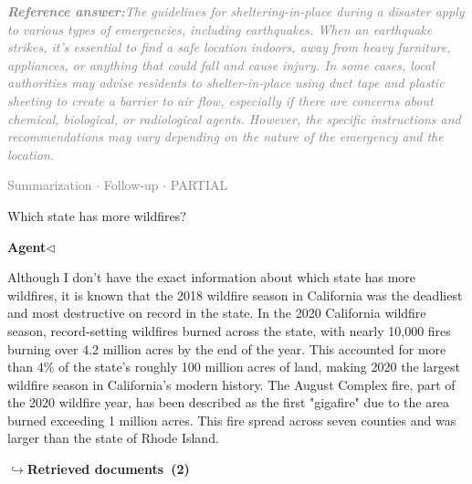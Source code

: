 \documentclass[a4paper,11pt]{article}
\begin{document}
\begin{refanswerenv}
{\footnotesize\textit{\textcolor{gray}{\textbf{Reference answer:}\enspace The guidelines for sheltering-in-place during a disaster apply to various types of emergencies, including earthquakes. When an earthquake strikes, it's essential to find a safe location indoors, away from heavy furniture, appliances, or anything that could fall and cause injury. In some cases, local authorities may advise residents to shelter-in-place using duct tape and plastic sheeting to create a barrier to air flow, especially if there are concerns about chemical, biological, or radiological agents. However, the specific instructions and recommendations may vary depending on the nature of the emergency and the location.}}}
\end{refanswerenv}
\vspace{0.5em}
\hfill{\tiny\textcolor{gray}{Summarization $\cdot$ Follow-up $\cdot$ PARTIAL}}
\begin{userbubble}
Which state has more wildfires?
\end{userbubble}
\noindent\hfill{\small\textcolor{agentcolor}{\textbf{Agent\enspace$\triangleleft$}}}
\begin{agentbubble}
 Although I don't have the exact information about which state has more wildfires, it is known that the 2018 wildfire season in California was the deadliest and most destructive on record in the state. In the 2020 California wildfire season, record-setting wildfires burned across the state, with nearly 10,000 fires burning over 4.2 million acres by the end of the year. This accounted for more than 4\% of the state's roughly 100 million acres of land, making 2020 the largest wildfire season in California's modern history. The August Complex fire, part of the 2020 wildfire year, has been described as the first "gigafire" due to the area burned exceeding 1 million acres. This fire spread across seven counties and was larger than the state of Rhode Island.
\end{agentbubble}
\noindent\hfill{\footnotesize\textcolor{doccolor}{\textbf{$\hookrightarrow$\enspace Retrieved documents~(2)}}}
\end{document}
